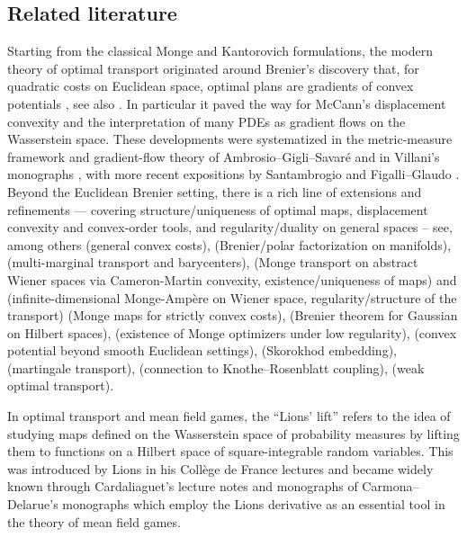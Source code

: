 \documentclass[a4paper]{amsart}
\numberwithin{theorem}{section}
\theoremstyle{definition}
\begin{document}
\subsection{Related literature}\label{sec:intro_literature}


Starting from the classical Monge and Kantorovich formulations, the modern theory of optimal transport  originated around Brenier’s discovery that, for quadratic costs on Euclidean space, optimal plans are gradients of convex potentials \cite{Br91}, see also \cite{KnSm84, RaRu90}. 
In particular it paved the way for McCann’s displacement convexity \cite{Mc94} and the interpretation of many PDEs as gradient flows on the Wasserstein space. These developments were systematized in the metric-measure framework and gradient-flow theory of Ambrosio--Gigli--Savaré \cite{AmGiSa08,AmGi13} and in Villani’s monographs \cite{Vi03,Vi09}, with more recent expositions by Santambrogio \cite{Sa15} and Figalli--Glaudo \cite{FiGl21}. Beyond the Euclidean Brenier setting, there is a rich line of extensions and refinements --- covering structure/uniqueness of optimal maps, displacement convexity and convex-order tools, and regularity/duality on general spaces -- see, among others  \cite{GaMc96} (general convex costs), \cite{Mc95} (Brenier/polar factorization on manifolds), \cite{GaSw98, AgCa11}  (multi-marginal transport and barycenters),
\cite{FeUs02} (Monge transport on abstract Wiener spaces via Cameron-Martin convexity, existence/uniqueness of maps) and \cite{FeUs04a} (infinite-dimensional Monge-Ampère on Wiener space, regularity/structure of the transport)\cite{AmKiPr04} (Monge maps for strictly convex costs), \cite{AmGiSa08} (Brenier theorem for Gaussian on Hilbert spaces), \cite{ChDe10, ChPa2011} (existence of Monge optimizers under low regularity), \cite{Gi11} (convex potential beyond smooth Euclidean settings), \cite{BeCoHu14} (Skorokhod embedding), \cite{BeJu16, HeTo13, GhKiLi16b} (martingale transport), \cite{CaGaSa09} (connection to Knothe--Rosenblatt coupling), \cite{GoJu18} (weak optimal transport). 

In optimal transport and mean field games, the ``Lions’ lift'' refers to the idea of studying maps defined on the Wasserstein space of probability measures by lifting them to functions on a Hilbert space of square-integrable random variables.
This was introduced by Lions in his Collège de France lectures \cite{Li13} and became widely known through Cardaliaguet’s lecture notes \cite{Ca13} and monographs of Carmona--Delarue’s monographs \cite{CaDe18, CaDe18b} which employ the Lions derivative as an essential tool in the theory of mean field games.
\end{document}
